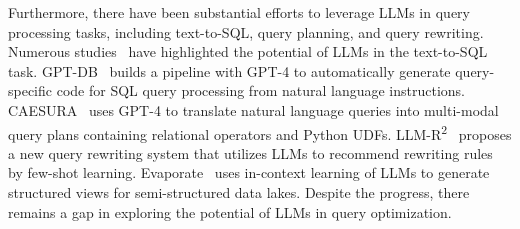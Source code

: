 Furthermore, there have been substantial efforts to leverage LLMs in query processing tasks, including text-to-SQL, query planning, and query rewriting.  
Numerous studies~\cite{DBLP:conf/nips/LiHQYLLWQGHZ0LC23, DBLP:journals/corr/abs-2306-00739, DBLP:journals/corr/abs-2406-08426} have highlighted the potential of LLMs in the text-to-SQL task. 
GPT-DB~\cite{DBLP:journals/pvldb/Trummer23} builds a pipeline with GPT-4 to automatically generate query-specific code for SQL query processing from natural language instructions. 
CAESURA~\cite{DBLP:conf/cidr/UrbanB24} uses GPT-4 to translate natural language queries into multi-modal query plans containing relational operators and Python UDFs.
LLM-R\textsuperscript{2}~\cite{DBLP:journals/corr/abs-2404-12872} proposes a new query rewriting system that utilizes LLMs to recommend rewriting rules by few-shot learning.
Evaporate~\cite{DBLP:journals/pvldb/AroraYENHTR23} uses in-context learning of LLMs to generate structured views for semi-structured data lakes. 
Despite the progress, there remains a gap in exploring the potential of LLMs in query optimization. 

